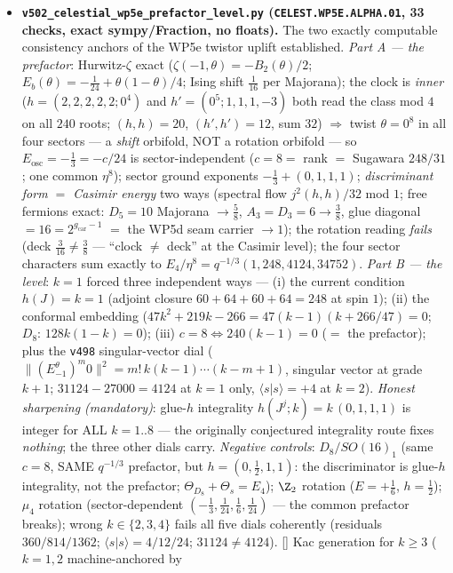 \documentclass[11pt]{article}
\providecommand{\gcar}{g_{\mathrm{car}}}\providecommand{\Nfam}{N_{\mathrm{fam}}}
\begin{document}
\begin{itemize}[leftmargin=1.5em]
\item \textbf{\texttt{v502\_celestial\_wp5e\_prefactor\_level.py} (\texttt{CELEST.WP5E.ALPHA.01}, 33
checks, exact sympy/Fraction, no floats).} The two exactly computable consistency anchors of the
WP5e twistor uplift established. \emph{Part A --- the prefactor}: Hurwitz-$\zeta$ exact
($\zeta(-1,\theta)=-B_2(\theta)/2$; $E_b(\theta)=-\tfrac1{24}+\theta(1-\theta)/4$; Ising shift
$\tfrac1{16}$ per Majorana); the clock is \emph{inner} ($h=(2,2,2,2,2;0^4)$ and $h'=(0^5;1,1,1,-3)$
both read the class mod $4$ on all $240$ roots; $(h,h)=20$, $(h',h')=12$, sum $32$) $\Rightarrow$
twist $\theta=0^8$ in all four sectors --- a \emph{shift} orbifold, NOT a rotation orbifold ---
so $E_{\mathrm{osc}}=-\tfrac13=-c/24$ is sector-independent ($c=8=$ rank $=$ Sugawara $248/31$;
one common $\eta^8$); sector ground exponents $-\tfrac13+(0,1,1,1)$; \emph{discriminant form $=$
Casimir energy} two ways (spectral flow $j^2(h,h)/32$ mod $1$; free fermions exact: $D_5=10$
Majorana $\to\tfrac58$, $A_3=D_3=6\to\tfrac38$, glue diagonal $=16=2^{\gcar-1}$ $=$ the WP5d seam
carrier $\to1$); the rotation reading \emph{fails} (deck $\tfrac3{16}\neq\tfrac38$ --- ``clock
$\neq$ deck'' at the Casimir level); the four sector characters sum exactly to
$E_4/\eta^8=q^{-1/3}(1,248,4124,34752)$. \emph{Part B --- the level}: $k=1$ forced three
independent ways --- (i) the current condition $h(J)=k=1$ (adjoint closure $60{+}64{+}60{+}64=248$
at spin $1$); (ii) the conformal embedding ($47k^2{+}219k{-}266=47(k{-}1)(k{+}266/47)=0$; $D_8$:
$128k(1{-}k)=0$); (iii) $c=8\Leftrightarrow240(k{-}1)=0$ ($=$ the prefactor); plus the \texttt{v498}
singular-vector dial ($\|(E^\theta_{-1})^m0\|^2=m!\,k(k{-}1)\cdots(k{-}m{+}1)$, singular vector at
grade $k{+}1$; $31124-27000=4124$ at $k{=}1$ only, $\langle s|s\rangle=+4$ at $k{=}2$).
\emph{Honest sharpening (mandatory)}: glue-$h$ integrality $h(J^j;k)=k\,(0,1,1,1)$ is integer for
ALL $k=1..8$ --- the originally conjectured integrality route fixes \emph{nothing}; the three other
dials carry. \emph{Negative controls}: $D_8/SO(16)_1$ (same $c=8$, SAME $q^{-1/3}$ prefactor, but
$h=(0,\tfrac12,1,1)$: the discriminator is glue-$h$ integrality, not the prefactor;
$\Theta_{D_8}+\Theta_s=E_4$); $\Z_2$ rotation ($E=+\tfrac16$, $h=\tfrac12$); $\mu_4$ rotation
(sector-dependent $(-\tfrac13,\tfrac1{24},\tfrac16,\tfrac1{24})$ --- the common prefactor breaks);
wrong $k\in\{2,3,4\}$ fails all five dials coherently (residuals $360/814/1362$; $\langle
s|s\rangle=4/12/24$; $31124\neq4124$). [\mC] Kac generation for $k\ge3$ ($k=1,2$ machine-anchored by

\end{itemize}
\end{document}
